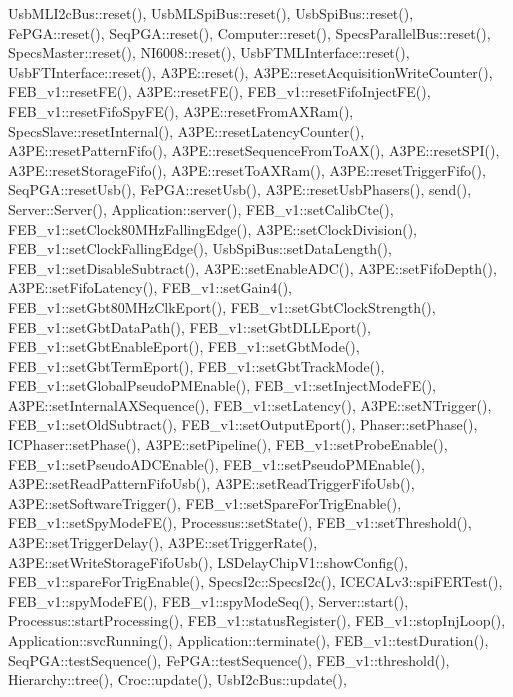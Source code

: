 Usb\+M\+L\+I2c\+Bus\+::reset(), Usb\+M\+L\+Spi\+Bus\+::reset(), Usb\+Spi\+Bus\+::reset(), Fe\+P\+G\+A\+::reset(), Seq\+P\+G\+A\+::reset(), Computer\+::reset(), Specs\+Parallel\+Bus\+::reset(), Specs\+Master\+::reset(), N\+I6008\+::reset(), Usb\+F\+T\+M\+L\+Interface\+::reset(), Usb\+F\+T\+Interface\+::reset(), A3\+P\+E\+::reset(), A3\+P\+E\+::reset\+Acquisition\+Write\+Counter(), F\+E\+B\+\_\+v1\+::reset\+F\+E(), A3\+P\+E\+::reset\+F\+E(), F\+E\+B\+\_\+v1\+::reset\+Fifo\+Inject\+F\+E(), F\+E\+B\+\_\+v1\+::reset\+Fifo\+Spy\+F\+E(), A3\+P\+E\+::reset\+From\+A\+X\+Ram(), Specs\+Slave\+::reset\+Internal(), A3\+P\+E\+::reset\+Latency\+Counter(), A3\+P\+E\+::reset\+Pattern\+Fifo(), A3\+P\+E\+::reset\+Sequence\+From\+To\+A\+X(), A3\+P\+E\+::reset\+S\+P\+I(), A3\+P\+E\+::reset\+Storage\+Fifo(), A3\+P\+E\+::reset\+To\+A\+X\+Ram(), A3\+P\+E\+::reset\+Trigger\+Fifo(), Seq\+P\+G\+A\+::reset\+Usb(), Fe\+P\+G\+A\+::reset\+Usb(), A3\+P\+E\+::reset\+Usb\+Phasers(), send(), Server\+::\+Server(), Application\+::server(), F\+E\+B\+\_\+v1\+::set\+Calib\+Cte(), F\+E\+B\+\_\+v1\+::set\+Clock80\+M\+Hz\+Falling\+Edge(), A3\+P\+E\+::set\+Clock\+Division(), F\+E\+B\+\_\+v1\+::set\+Clock\+Falling\+Edge(), Usb\+Spi\+Bus\+::set\+Data\+Length(), F\+E\+B\+\_\+v1\+::set\+Disable\+Subtract(), A3\+P\+E\+::set\+Enable\+A\+D\+C(), A3\+P\+E\+::set\+Fifo\+Depth(), A3\+P\+E\+::set\+Fifo\+Latency(), F\+E\+B\+\_\+v1\+::set\+Gain4(), F\+E\+B\+\_\+v1\+::set\+Gbt80\+M\+Hz\+Clk\+Eport(), F\+E\+B\+\_\+v1\+::set\+Gbt\+Clock\+Strength(), F\+E\+B\+\_\+v1\+::set\+Gbt\+Data\+Path(), F\+E\+B\+\_\+v1\+::set\+Gbt\+D\+L\+L\+Eport(), F\+E\+B\+\_\+v1\+::set\+Gbt\+Enable\+Eport(), F\+E\+B\+\_\+v1\+::set\+Gbt\+Mode(), F\+E\+B\+\_\+v1\+::set\+Gbt\+Term\+Eport(), F\+E\+B\+\_\+v1\+::set\+Gbt\+Track\+Mode(), F\+E\+B\+\_\+v1\+::set\+Global\+Pseudo\+P\+M\+Enable(), F\+E\+B\+\_\+v1\+::set\+Inject\+Mode\+F\+E(), A3\+P\+E\+::set\+Internal\+A\+X\+Sequence(), F\+E\+B\+\_\+v1\+::set\+Latency(), A3\+P\+E\+::set\+N\+Trigger(), F\+E\+B\+\_\+v1\+::set\+Old\+Subtract(), F\+E\+B\+\_\+v1\+::set\+Output\+Eport(), Phaser\+::set\+Phase(), I\+C\+Phaser\+::set\+Phase(), A3\+P\+E\+::set\+Pipeline(), F\+E\+B\+\_\+v1\+::set\+Probe\+Enable(), F\+E\+B\+\_\+v1\+::set\+Pseudo\+A\+D\+C\+Enable(), F\+E\+B\+\_\+v1\+::set\+Pseudo\+P\+M\+Enable(), A3\+P\+E\+::set\+Read\+Pattern\+Fifo\+Usb(), A3\+P\+E\+::set\+Read\+Trigger\+Fifo\+Usb(), A3\+P\+E\+::set\+Software\+Trigger(), F\+E\+B\+\_\+v1\+::set\+Spare\+For\+Trig\+Enable(), F\+E\+B\+\_\+v1\+::set\+Spy\+Mode\+F\+E(), Processus\+::set\+State(), F\+E\+B\+\_\+v1\+::set\+Threshold(), A3\+P\+E\+::set\+Trigger\+Delay(), A3\+P\+E\+::set\+Trigger\+Rate(), A3\+P\+E\+::set\+Write\+Storage\+Fifo\+Usb(), L\+S\+Delay\+Chip\+V1\+::show\+Config(), F\+E\+B\+\_\+v1\+::spare\+For\+Trig\+Enable(), Specs\+I2c\+::\+Specs\+I2c(), I\+C\+E\+C\+A\+Lv3\+::spi\+F\+E\+R\+Test(), F\+E\+B\+\_\+v1\+::spy\+Mode\+F\+E(), F\+E\+B\+\_\+v1\+::spy\+Mode\+Seq(), Server\+::start(), Processus\+::start\+Processing(), F\+E\+B\+\_\+v1\+::status\+Register(), F\+E\+B\+\_\+v1\+::stop\+Inj\+Loop(), Application\+::svc\+Running(), Application\+::terminate(), F\+E\+B\+\_\+v1\+::test\+Duration(), Seq\+P\+G\+A\+::test\+Sequence(), Fe\+P\+G\+A\+::test\+Sequence(), F\+E\+B\+\_\+v1\+::threshold(), Hierarchy\+::tree(), Croc\+::update(), Usb\+I2c\+Bus\+::update(), 